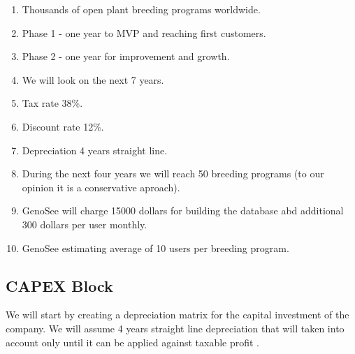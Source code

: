 \documentclass[
]{article}
\providecommand{\tightlist}{%
  \setlength{\itemsep}{0pt}\setlength{\parskip}{0pt}}
\begin{document}
\begin{enumerate}
\def\labelenumi{\arabic{enumi}.}
\tightlist
\item
  Thousands of open plant breeding programs worldwide.
\item
  Phase 1 - one year to MVP and reaching first customers.
\item
  Phase 2 - one year for improvement and growth.
\item
  We will look on the next 7 years.
\item
  Tax rate 38\%.
\item
  Discount rate 12\%.
\item
  Depreciation 4 years straight line.
\item
  During the next four years we will reach 50 breeding programs (to our
  opinion it is a conservative aproach).
\item
  GenoSee will charge 15000 dollars for building the database abd
  additional 300 dollars per user monthly.
\item
  GenoSee estimating average of 10 users per breeding program.
\end{enumerate}

\hypertarget{capex-block}{%
\subsection{CAPEX Block}\label{capex-block}}

We will start by creating a depreciation matrix for the capital
investment of the company. We will assume 4 years straight line
depreciation that will taken into account only until it can be applied
against taxable profit .
\end{document}
